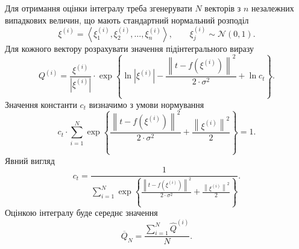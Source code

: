 Для отримання оцінки інтегралу
треба згенерувати $N$ векторів з $n$ незалежних випадкових величин,
що мають стандартний нормальний розподіл
\begin{equation*}
  \xi^{\left( i \right)}
  = \left\langle \xi^{\left( i \right)}_1, \xi^{\left( i \right)}_2, \dots,
  \xi^{\left( i \right)}_n \right\rangle,\qquad
  \xi^{\left( i \right)}_j \sim \mathcal{N}\left( 0, 1 \right).
\end{equation*}
Для кожного вектору розрахувати значення підінтегрального виразу
\begin{equation*}
  Q^{\left( i \right)}
  = \frac{\xi^{\left( i \right)}}{\left| \xi^{\left( i \right)} \right|}
  \cdot \exp{\left\{
      \ln{\left| \xi^{\left( i \right)} \right|}
      - \frac{\left\| t - f\left( \xi^{\left( i \right)} \right) \right\|^2}
             {2 \cdot \sigma^2}
      + \ln{c_t}
     \right\}
   }.
\end{equation*}
Значення константи $c_t$ визначимо з умови нормування
\begin{equation*}
  c_t \cdot
  \sum_{i=1}^{N}
    \exp{\left\{
      \frac{\left\| t - f\left( \xi^{\left( i \right)} \right) \right\|^2}
           {2 \cdot \sigma^2}
       + \frac{\left\| \xi^{\left( i \right)} \right\|^2}{2}
     \right\}}
  = 1.
\end{equation*}
Явний вигляд
\begin{equation*}
  c_t
  = \frac{1}{\sum\limits_{i=1}^{N}
    \exp{\left\{
      \frac{\left\| t - f\left( \xi^{\left( i \right)} \right) \right\|^2}
           {2 \cdot \sigma^2}
      + \frac{\left\| \xi^{\left( i \right)} \right\|^2}{2}
    \right\}}}.
\end{equation*}
Оцінкою інтегралу буде середнє значення
\begin{equation*}
  \overline{Q}_N = \frac{\sum\limits_{i=1}^{N}
    \hat{Q}^{\left( i \right)}}{N}.
\end{equation*}

